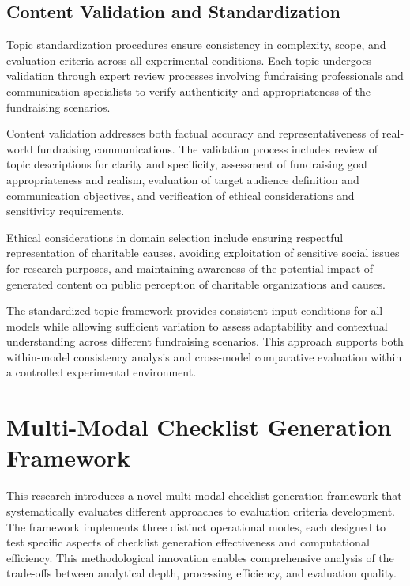 \subsection{Content Validation and Standardization}

Topic standardization procedures ensure consistency in complexity, scope, and evaluation criteria across all experimental conditions. Each topic undergoes validation through expert review processes involving fundraising professionals and communication specialists to verify authenticity and appropriateness of the fundraising scenarios.

Content validation addresses both factual accuracy and representativeness of real-world fundraising communications. The validation process includes review of topic descriptions for clarity and specificity, assessment of fundraising goal appropriateness and realism, evaluation of target audience definition and communication objectives, and verification of ethical considerations and sensitivity requirements.

Ethical considerations in domain selection include ensuring respectful representation of charitable causes, avoiding exploitation of sensitive social issues for research purposes, and maintaining awareness of the potential impact of generated content on public perception of charitable organizations and causes.

The standardized topic framework provides consistent input conditions for all models while allowing sufficient variation to assess adaptability and contextual understanding across different fundraising scenarios. This approach supports both within-model consistency analysis and cross-model comparative evaluation within a controlled experimental environment.

\section{Multi-Modal Checklist Generation Framework}
\label{sec:multi-modal-checklist}

This research introduces a novel multi-modal checklist generation framework that systematically evaluates different approaches to evaluation criteria development. The framework implements three distinct operational modes, each designed to test specific aspects of checklist generation effectiveness and computational efficiency. This methodological innovation enables comprehensive analysis of the trade-offs between analytical depth, processing efficiency, and evaluation quality.

